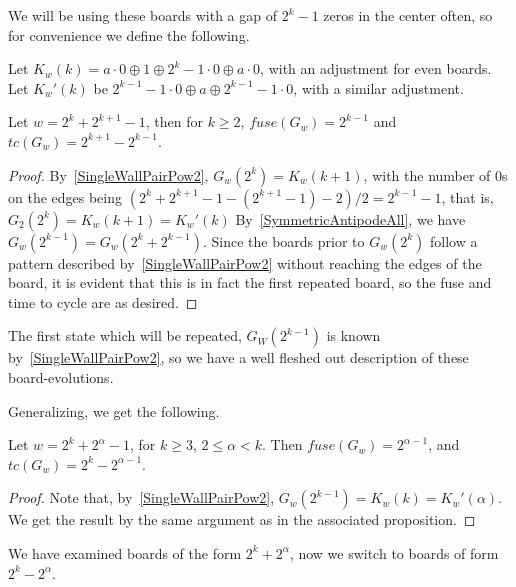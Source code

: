 \documentclass[12pt,letterpaper]{article}
\begin{document}
We will be using these boards with a gap of $2^k-1$ zeros in the center often, so for convenience we define the following.
\begin{dfn}
  Let $K_w(k)=a\cdot 0\oplus 1\oplus 2^k-1\cdot 0\oplus a\cdot 0$, with an adjustment for even boards. Let $K_w'(k)$ be $2^{k-1}-1\cdot 0\oplus a\oplus 2^{k-1}-1\cdot 0$, with a similar adjustment.
\end{dfn}

\begin{prop}\label{BetweenPows2}
  Let $w=2^k+2^{k+1}-1$, then for $k\geq 2$, $fuse(G_w)=2^{k-1}$ and $tc(G_w)=2^{k+1}-2^{k-1}$.
\end{prop}
\begin{proof}
  By~\cref{SingleWallPairPow2}, %
  $G_w(2^k)=K_w(k+1)$, with the number of 0s on the edges being $(2^k+2^{k+1}-1-(2^{k+1}-1)-2)/2=2^{k-1}-1$, that is, $G_2(2^k)=K_w(k+1)=K_w'(k)$ By~\cref{SymmetricAntipodeAll}, we have $G_w(2^{k-1})=G_w(2^k+2^{k-1})$. Since the boards prior to $G_w(2^k)$ follow a pattern described by~\cref{SingleWallPairPow2} without reaching the edges of the board, it is evident that this is in fact the first repeated board, so the fuse and time to cycle are as desired. 
\end{proof}
\begin{remark}
  The first state which will be repeated, $G_W(2^{k-1})$ is known by~\cref{SingleWallPairPow2}, so we have a well fleshed out description of these board-evolutions.
\end{remark}
Generalizing, we get the following.
\begin{cor}\label{Pow2PlusPow2}
  Let $w=2^k+2^\alpha-1$, for $k\geq 3$, $2\leq \alpha<k$. Then $fuse(G_w)=2^{\alpha-1}$, and $tc(G_w)=2^k-2^{\alpha-1}$.
\end{cor}
\begin{proof}
  Note that, by~\cref{SingleWallPairPow2}, $G_w(2^{k-1})=K_w(k)=K_w'(\alpha)$. We get the result by the same argument as in the associated proposition.
\end{proof}

We have examined boards of the form $2^k+2^\alpha$, now we switch to boards of form $2^k-2^\alpha$. 
\end{document}
